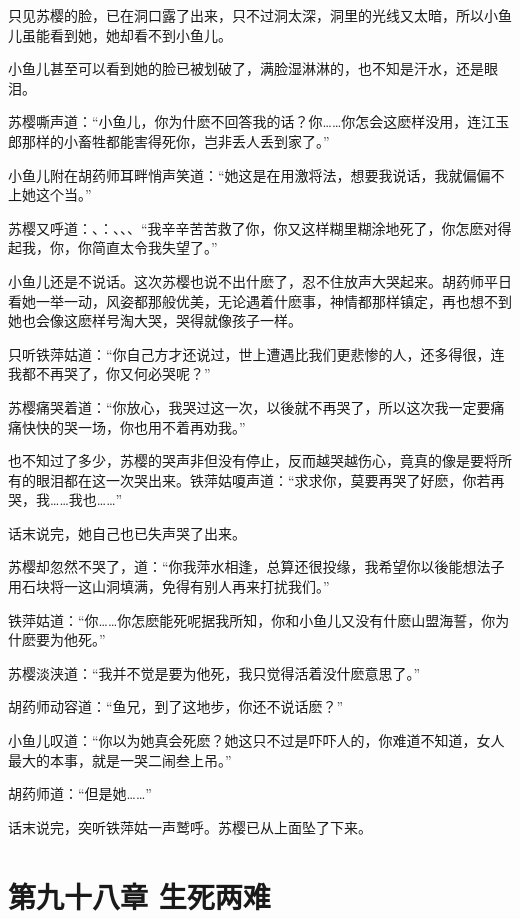\documentclass[12pt,oneside]{book}
\begin{document}
只见苏樱的脸，已在洞口露了出来，只不过洞太深，洞里的光线又太暗，所以小鱼儿虽能看到她，她却看不到小鱼儿。

小鱼儿甚至可以看到她的脸已被划破了，满脸湿淋淋的，也不知是汗水，还是眼泪。

苏樱嘶声道：``小鱼儿，你为什麽不回答我的话？你\ldots\ldots 你怎会这麽样没用，连江玉郎那样的小畜牲都能害得死你，岂非丢人丢到家了。''

小鱼儿附在胡药师耳畔悄声笑道：``她这是在用激将法，想要我说话，我就偏偏不上她这个当。''

苏樱又呼道：、：、、、``我辛辛苦苦救了你，你又这样糊里糊涂地死了，你怎麽对得起我，你，你简直太令我失望了。''

小鱼儿还是不说话。这次苏樱也说不出什麽了，忍不住放声大哭起来。胡药师平日看她一举一动，风姿都那般优美，无论遇着什麽事，神情都那样镇定，再也想不到她也会像这麽样号淘大哭，哭得就像孩子一样。

只听铁萍姑道：``你自己方才还说过，世上遭遇比我们更悲惨的人，还多得很，连我都不再哭了，你又何必哭呢？''

苏樱痛哭着道：``你放心，我哭过这一次，以後就不再哭了，所以这次我一定要痛痛快快的哭一场，你也用不着再劝我。''

也不知过了多少，苏樱的哭声非但没有停止，反而越哭越伤心，竟真的像是要将所有的眼泪都在这一次哭出来。铁萍姑嗄声道：``求求你，莫要再哭了好麽，你若再哭，我\ldots\ldots 我也\ldots\ldots{}''

话末说完，她自己也已失声哭了出来。

苏樱却忽然不哭了，道：``你我萍水相逢，总算还很投缘，我希望你以後能想法子用石块将一这山洞填满，免得有别人再来打扰我们。''

铁萍姑道：``你\ldots\ldots 你怎麽能死呢据我所知，你和小鱼儿又没有什麽山盟海誓，你为什麽要为他死。''

苏樱淡浃道：``我并不觉是要为他死，我只觉得活着没什麽意思了。''

胡药师动容道：``鱼兄，到了这地步，你还不说话麽？''

小鱼儿叹道：``你以为她真会死麽？她这只不过是吓吓人的，你难道不知道，女人最大的本事，就是一哭二闹叁上吊。''

胡药师道：``但是她\ldots\ldots{}''

话末说完，突听铁萍姑一声鹫呼。苏樱已从上面坠了下来。

\hypertarget{ux7b2cux4e5dux5341ux516bux7ae0-ux751fux6b7bux4e24ux96be}{%
\chapter{第九十八章
生死两难}\label{ux7b2cux4e5dux5341ux516bux7ae0-ux751fux6b7bux4e24ux96be}}
\end{document}
